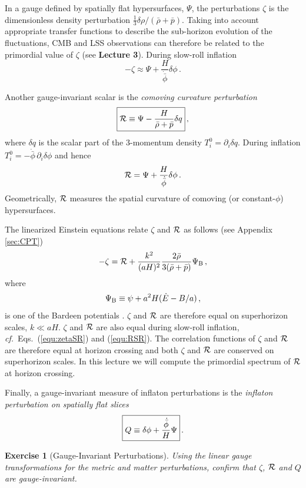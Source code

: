 \documentclass[12pt,letterpaper,rotate]{article}
\def\beq{\begin{equation}}
\def\eeq{\end{equation}}
\def\R{{\cal R}}
\newtheorem{thm}{Exercise}
\begin{document}
{In a gauge defined by spatially flat hypersurfaces, $\Psi$, the perturbations $\zeta$ is the
dimensionless density perturbation $\frac{1}{3} \delta \rho/(\bar \rho+ \bar p )$.
Taking into account appropriate transfer functions to describe the sub-horizon evolution of the fluctuations,
CMB and LSS observations can therefore be related to the primordial value of $\zeta$ (see {\bf Lecture 3}). 
During slow-roll inflation
\beq
\label{equ:zetaSR}
- \zeta \approx \Psi + \frac{H}{\dot{\bar \phi}} \delta \phi\, .
\eeq

Another gauge-invariant scalar is the {\it comoving curvature perturbation}
\beq
\fbox{$\displaystyle
{\cal R} \equiv \Psi - \frac{H}{\bar \rho + \bar p} \delta q $}\, ,
\eeq
where $\delta q$ is the scalar part of the 3-momentum density $T^0_i = \partial_i \delta q$.
During inflation $T^0_i = - \dot{\bar \phi}\, \partial_i \delta \phi$ and hence
\beq
\label{equ:RSR}
\R = \Psi + \frac{H}{\dot{\bar \phi}} \delta \phi\, .
\eeq
Geometrically, ${\cal R}$ measures the spatial curvature of comoving (or constant-$\phi$) hypersurfaces. %

The linearized Einstein equations relate $\zeta$ and ${\cal R}$ as follows (see Appendix \ref{sec:CPT})
\beq
-\zeta = {\cal R} + \frac{k^2}{(aH)^2} \frac{2 \bar \rho}{3(\bar \rho + \bar p)} \Psi_{\rm B}\, ,
\eeq
where
\beq
\Psi_{\rm B} \equiv \psi + a^2 H (\dot E - B/a)\, ,
\eeq
is one of the Bardeen potentials \cite{Bardeen:1980kt}.
$\zeta$ and ${\cal R}$ are therefore equal on superhorizon scales, $k \ll aH$.
$\zeta$ and ${\cal R}$ are also equal during slow-roll inflation, {\it cf.}~Eqs.~(\ref{equ:zetaSR}) and (\ref{equ:RSR}).
The correlation functions of $\zeta$ and $\R$ are therefore equal at horizon crossing and both $\zeta$ and $\R$ are conserved on superhorizon scales.
In this lecture we will compute the primordial spectrum of $\R$ at horizon crossing.

Finally, a gauge-invariant measure of inflaton perturbations is the {\it inflaton perturbation on spatially flat slices}
\beq
\fbox{$\displaystyle
Q \equiv \delta \phi + \frac{\dot {\bar \phi}}{H}\Psi $}\, .
\eeq

\begin{thm}[Gauge-Invariant Perturbations]
Using the linear gauge transformations for the metric and matter perturbations, confirm that $\zeta$, $\R$ and $Q$ are gauge-invariant.
\label{ex:gauge2}
\end{thm}


}
\end{document}
